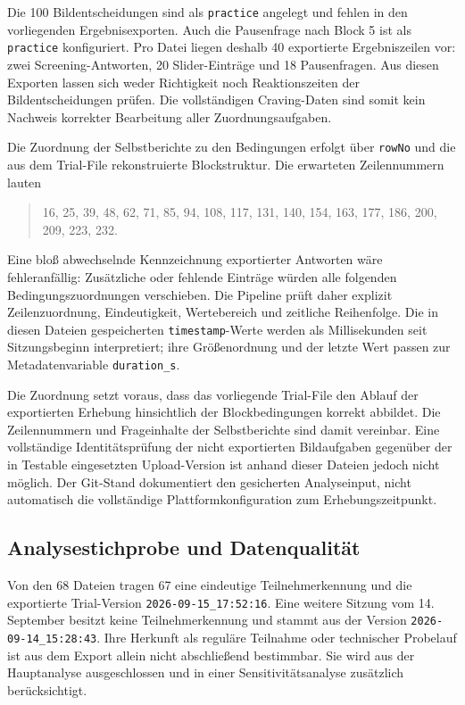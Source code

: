 Die 100 Bildentscheidungen sind als \texttt{practice} angelegt und fehlen in den vorliegenden Ergebnisexporten. Auch die Pausenfrage nach Block 5 ist als \texttt{practice} konfiguriert. Pro Datei liegen deshalb 40 exportierte Ergebniszeilen vor: zwei Screening-Antworten, 20 Slider-Einträge und 18 Pausenfragen. Aus diesen Exporten lassen sich weder Richtigkeit noch Reaktionszeiten der Bildentscheidungen prüfen. Die vollständigen Craving-Daten sind somit kein Nachweis korrekter Bearbeitung aller Zuordnungsaufgaben.

Die Zuordnung der Selbstberichte zu den Bedingungen erfolgt über \texttt{rowNo} und die aus dem Trial-File rekonstruierte Blockstruktur. Die erwarteten Zeilennummern lauten
\begin{quote}\small
16, 25, 39, 48, 62, 71, 85, 94, 108, 117, 131, 140, 154, 163, 177, 186, 200, 209, 223, 232.
\end{quote}
Eine bloß abwechselnde Kennzeichnung exportierter Antworten wäre fehleranfällig: Zusätzliche oder fehlende Einträge würden alle folgenden Bedingungszuordnungen verschieben. Die Pipeline prüft daher explizit Zeilenzuordnung, Eindeutigkeit, Wertebereich und zeitliche Reihenfolge. Die in diesen Dateien gespeicherten \texttt{timestamp}-Werte werden als Millisekunden seit Sitzungsbeginn interpretiert; ihre Größenordnung und der letzte Wert passen zur Metadatenvariable \texttt{duration\_s}.

Die Zuordnung setzt voraus, dass das vorliegende Trial-File den Ablauf der exportierten Erhebung hinsichtlich der Blockbedingungen korrekt abbildet. Die Zeilennummern und Frageinhalte der Selbstberichte sind damit vereinbar. Eine vollständige Identitätsprüfung der nicht exportierten Bildaufgaben gegenüber der in Testable eingesetzten Upload-Version ist anhand dieser Dateien jedoch nicht möglich. Der Git-Stand dokumentiert den gesicherten Analyseinput, nicht automatisch die vollständige Plattformkonfiguration zum Erhebungszeitpunkt.

\subsection{Analysestichprobe und Datenqualität}
Von den 68 Dateien tragen 67 eine eindeutige Teilnehmerkennung und die exportierte Trial-Version \texttt{2026-09-15\_17:52:16}. Eine weitere Sitzung vom 14. September besitzt keine Teilnehmerkennung und stammt aus der Version \texttt{2026-09-14\_15:28:43}. Ihre Herkunft als reguläre Teilnahme oder technischer Probelauf ist aus dem Export allein nicht abschließend bestimmbar. Sie wird aus der Hauptanalyse ausgeschlossen und in einer Sensitivitätsanalyse zusätzlich berücksichtigt.

